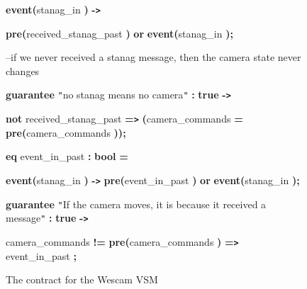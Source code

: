 \begin{figure}
{{{\color{color18} \textbf{event(}}stanag\_in{\color{color18} \textbf{)}} {\color{color18} \textbf{-\texttt{>}}} 
    

{\color{color18} \textbf{pre(}}received\_stanag\_past{\color{color18} \textbf{)}} 
{\color{color18} \textbf{or}} {\color{color18} \textbf{event(}}stanag\_in{\color{color18} \textbf{);}}

\vspace{12pt}
{\color{color17} --if we never received a stanag message, then the camera state 
never changes}

{\color{color18} \textbf{guarantee}} {\color{color19} \texttt{"}no stanag means 
no camera\texttt{"}} {\color{color18} \textbf{:}} {\color{color18} \textbf{true}} 
{\color{color18} \textbf{-\texttt{>}  }}

{\color{color18} \textbf{not}} received\_stanag\_past {\color{color18} \textbf{=\texttt{>}}} 
{\color{color18} \textbf{(}}camera\_commands {\color{color18} \textbf{=}} {\color{color18} \textbf{pre(}}camera\_commands{\color{color18} \textbf{)); 
 }}

\vspace{12pt}
{\color{color18} \textbf{eq}} event\_in\_past {\color{color18} \textbf{:}} {\color{color18} \textbf{bool}} 
{\color{color18} \textbf{=}}   

{\color{color18} \textbf{event(}}stanag\_in{\color{color18} \textbf{)}} {\color{color18} \textbf{-\texttt{>}}} 
{\color{color18} \textbf{pre(}}event\_in\_past{\color{color18} \textbf{)}} {\color{color18} \textbf{or}} 
{\color{color18} \textbf{event(}}stanag\_in{\color{color18} \textbf{);  }}

\vspace{12pt}
{\color{color18} \textbf{guarantee}} {\color{color19} \texttt{"}If the camera moves, 
it is because it received a message\texttt{"}}{\color{color18} \textbf{:}} {\color{color18} \textbf{true}} 
{\color{color18} \textbf{-\texttt{>}  }}

\baselineskip=13pt
\parindent=3pt
camera\_commands {\color{color18} \textbf{!=}} {\color{color18} \textbf{pre(}}camera\_commands{\color{color18} \textbf{)}} 
{\color{color18} \textbf{=\texttt{>}}} event\_in\_past{\color{color18} \textbf{;}}

}%
}
\caption{The contract for the Wescam VSM}
\label{fig:wescam-contract}
\end{figure}